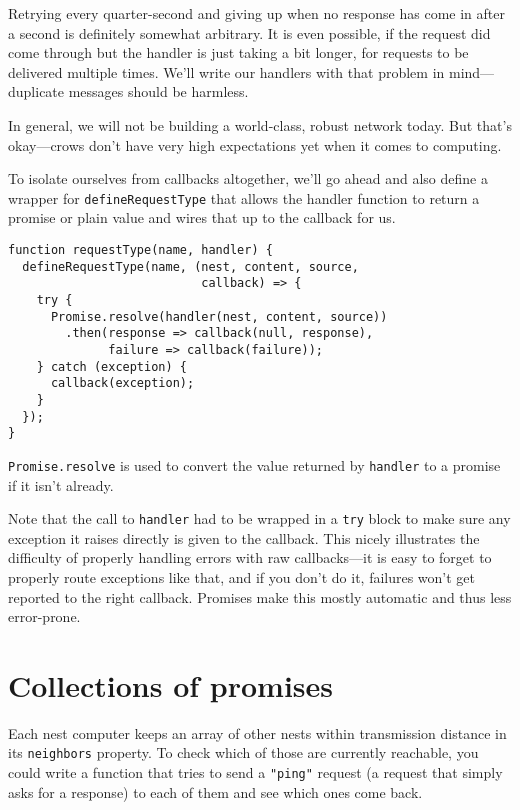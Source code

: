 Retrying every quarter-second and giving up when no response has come in after a second is definitely somewhat arbitrary. It is even possible, if the request did come through but the handler is just taking a bit longer, for requests to be delivered multiple times. We'll write our handlers with that problem in mind—duplicate messages should be harmless.

In general, we will not be building a world-class, robust network today. But that's okay—crows don't have very high expectations yet when it comes to computing.

To isolate ourselves from callbacks altogether, we'll go ahead and also define a wrapper for \lstinline`defineRequestType` that allows the handler function to return a promise or plain value and wires that up to the callback for us.

\begin{lstlisting}
function requestType(name, handler) {
  defineRequestType(name, (nest, content, source,
                           callback) => {
    try {
      Promise.resolve(handler(nest, content, source))
        .then(response => callback(null, response),
              failure => callback(failure));
    } catch (exception) {
      callback(exception);
    }
  });
}
\end{lstlisting}
\noindent{}

\lstinline`Promise.resolve` is used to convert the value returned by \lstinline`handler` to a promise if it isn't already.

Note that the call to \lstinline`handler` had to be wrapped in a \lstinline`try` block to make sure any exception it raises directly is given to the callback. This nicely illustrates the difficulty of properly handling errors with raw callbacks—it is easy to forget to properly route exceptions like that, and if you don't do it, failures won't get reported to the right callback. Promises make this mostly automatic and thus less error-prone.

\section{Collections of promises}

Each nest computer keeps an array of other nests within transmission distance in its \lstinline`neighbors` property. To check which of those are currently reachable, you could write a function that tries to send a \lstinline`"ping"` request (a request that simply asks for a response) to each of them and see which ones come back.


